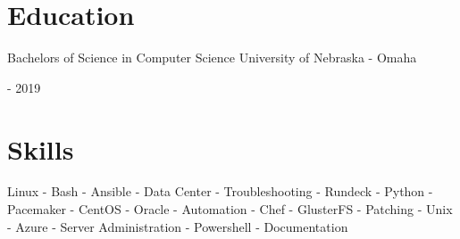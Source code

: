 \documentclass[10pt, a4paper]{article}
\begin{document}
\section*{Education}
    \begin{minipage}{0.5\textwidth} %
        \raggedright %
        Bachelors of Science in Computer Science
        University of Nebraska - Omaha
      \end{minipage}
      \begin{minipage}{0.5\textwidth} %
         \-- 2019
      \end{minipage}

\section*{Skills}
Linux - Bash - Ansible - Data Center - Troubleshooting - Rundeck - Python - Pacemaker - CentOS - Oracle - Automation - Chef - GlusterFS - Patching - Unix - Azure - Server Administration - Powershell - Documentation
\end{document}
